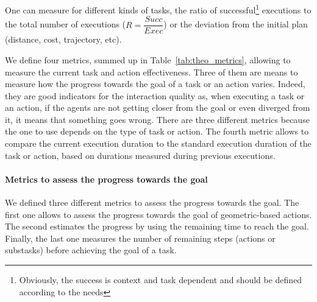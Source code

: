 \documentclass[a4paper,11pt,twoside]{StyleThese}
\begin{document}
One can measure for different kinds of tasks, the ratio of successful\footnote{Obviously, the success is context and task dependent and should be defined according to the needs} executions to the total number of executions (\eg $R=\dfrac{Succ}{Exec}$) or the deviation from the initial plan (distance, cost, trajectory, etc). 

We define four metrics, summed up in Table~\ref{tab:theo_metrics}, allowing to measure the current task and action effectiveness. Three of them are means to measure how the progress towards the goal of a task or an action varies. Indeed, they are good indicators for the interaction quality as, when executing a task or an action, if the agents are not getting closer from the goal or even diverged from it, it means that something goes wrong. There are three different metrics because the one to use depends on the type of task or action. The fourth metric allows to compare the current execution duration to the standard execution duration of the task or action, based on durations measured during previous executions.

\paragraph{Metrics to assess the progress towards the goal}

We defined three different metrics to assess the progress towards the goal. The first one allows to assess the progress towards the goal of geometric-based actions. The second estimates the progress by using the remaining time to reach the goal. Finally, the last one measures the number of remaining steps (actions or substasks) before achieving the goal of a task.
\end{document}
